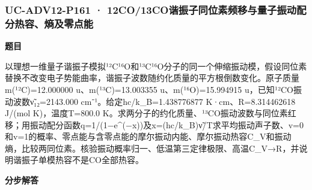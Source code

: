 \documentclass[UTF8,11pt,a4paper]{ctexart}
\begin{document}
\subsubsection*{UC-ADV12-P161 · 12CO/13CO谐振子同位素频移与量子振动配分热容、熵及零点能}
\noindent\textbf{题目}\par
以理想一维量子谐振子模拟¹²C¹⁶O和¹³C¹⁶O分子的同一个伸缩振动模，假设同位素替换不改变电子势能曲率，谐振子波数随约化质量的平方根倒数变化。原子质量m(¹²C)=12.000000 u、m(¹³C)=13.003355 u、m(¹⁶O)=15.994915 u，已知¹²CO振动波数ν̃₁₂=2143.000 cm⁻¹。给定hc/k\_B=1.438776877 K·cm、R=8.314462618 J/(mol K)，温度T=800.0 K。求两分子的约化质量、¹³CO振动波数与同位素红移；用振动配分函数q=1/(1−e\textasciicircum{}(−x))及x=(hc/k\_B)ν̃/T求平均振动声子数、v=0和v=1的概率、零点能与含零点能的摩尔振动内能、摩尔振动热容C\_V和振动熵，比较两同位素。核验振动概率归一、低温第三定律极限、高温C\_V→R，并说明谐振子单模热容不是CO全部热容。\par
\medskip\noindent\textbf{分步解答}
\end{document}
